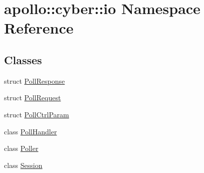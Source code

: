 \hypertarget{namespaceapollo_1_1cyber_1_1io}{\section{apollo\-:\-:cyber\-:\-:io Namespace Reference}
\label{namespaceapollo_1_1cyber_1_1io}
}
\subsection*{Classes}
\begin{DoxyCompactItemize}
\item 
struct \hyperlink{structapollo_1_1cyber_1_1io_1_1PollResponse}{Poll\-Response}
\item 
struct \hyperlink{structapollo_1_1cyber_1_1io_1_1PollRequest}{Poll\-Request}
\item 
struct \hyperlink{structapollo_1_1cyber_1_1io_1_1PollCtrlParam}{Poll\-Ctrl\-Param}
\item 
class \hyperlink{classapollo_1_1cyber_1_1io_1_1PollHandler}{Poll\-Handler}
\item 
class \hyperlink{classapollo_1_1cyber_1_1io_1_1Poller}{Poller}
\item 
class \hyperlink{classapollo_1_1cyber_1_1io_1_1Session}{Session}
\end{DoxyCompactItemize}
